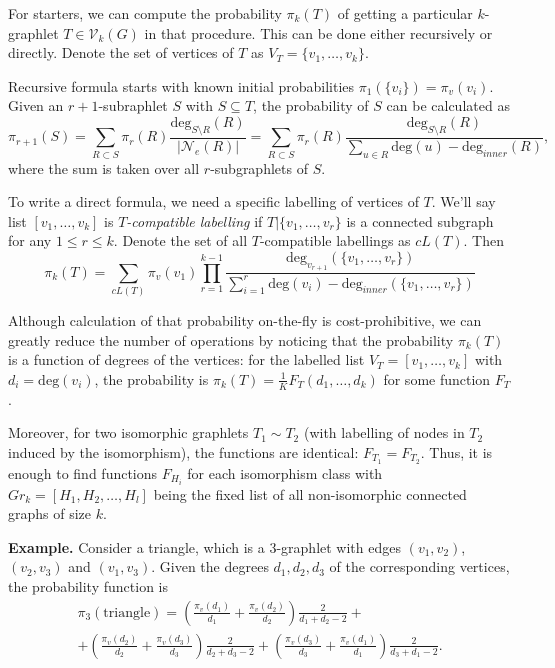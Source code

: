 \documentclass[11pt]{article}
\def\deg{\mathrm{deg}}
\def\cV{\mathcal{V}}
\def\cN{\mathcal{N}}
\theoremstyle{remark}
\theoremstyle{definition}
\begin{document}
	For starters, we can compute the probability $\pi_k(T)$ of getting a particular 
	$k$-graphlet $T \in \cV_k(G)$ in that procedure.
	This can be done either recursively or directly. Denote the set of vertices of $T$ as 
	$V_T=\{v_1,\ldots,v_k\}$.
	
	Recursive formula starts with known initial probabilities $\pi_1(\{v_i\}) = \pi_v(v_i)$. 
	Given an $r+1$-subraphlet $S$ with $S\subseteq T$, the probability of $S$ can be 
	calculated as
	\begin{equation*}
		\pi_{r+1}(S) = \sum_{R\subset S} \pi_r(R) \frac{\deg_{S\setminus R} (R)}
		{|\cN_e(R)|} = 
		\sum_{R\subset S} \pi_r(R) \frac{\deg_{S\setminus R} (R)}
		{\sum_{u\in R} \deg(u) - \deg_{inner}(R)},
	\end{equation*}
	where the sum is taken over all $r$-subgraphlets of $S$.
	
	To write a direct formula, we need a specific labelling of vertices of $T$.
	We'll say list $[v_1,\ldots, v_k]$ is \textit{$T$-compatible labelling} if 
	$T|\{v_1,\ldots,v_r\}$
	is a connected subgraph for any $1\leq r \leq k$. 
	Denote the set of all $T$-compatible labellings as $cL(T)$.
	Then 
	\begin{equation*}
		\pi_k(T) = \sum_{cL(T)} \pi_v(v_1)
		\prod_{r=1}^{k-1} \frac{\deg_{v_{r+1}}(\{v_1,\ldots,v_{r}\})}
		{\sum_{i=1}^r \deg(v_i) - \deg_{inner}(\{v_1,\ldots, v_r\})}
	\end{equation*}
	
	Although calculation of that probability on-the-fly is cost-prohibitive, we can 	
	greatly reduce the number of operations by noticing that the probability $\pi_k(T)$ is a 
	function of degrees of the vertices: for the labelled list 
	$V_T = [v_1, \ldots, v_k]$ with $d_i = \deg(v_i)$, the probability is 
	$\pi_k(T) =\frac{1}{K} F_T(d_1, \ldots, d_k)$ for some function $F_T$.
	
	Moreover, for two isomorphic graphlets $T_1 \sim T_2$ (with labelling of nodes in $T_2$ 
	induced by the isomorphism), the functions are identical: $F_{T_1} = F_{T_2}$. 
	Thus, it is enough to find functions $F_{H_i}$ for each isomorphism class with
	$Gr_k = [H_1, H_2, \ldots, H_l]$ being the fixed list of all non-isomorphic connected 
	graphs of size $k$. 
	
	\textbf{Example.} Consider a triangle, which is a 3-graphlet with edges $(v_1,v_2)$, 
	$(v_2, v_3)$ and $(v_1,v_3)$. Given the degrees $d_1, d_2, d_3$ of the corresponding 
	vertices, the probability function is
	\begin{multline*}
		\pi_3(\mathrm{triangle}) = \left( \frac{\pi_v(d_1)}{d_1} + 
		\frac{\pi_v(d_2)}{d_2}\right) \frac{2}{d_1+d_2-2} +\\ 
		+ \left( \frac{\pi_v(d_2)}{d_2} + \frac{\pi_v(d_3)}{d_3}\right) 
		\frac{2}{d_2+d_3-2} + \left( \frac{\pi_v(d_3)}{d_3} + \frac{\pi_v(d_1)}{d_1}\right) 
		\frac{2}{d_3+d_1-2}.
	\end{multline*}
	
\end{document}
